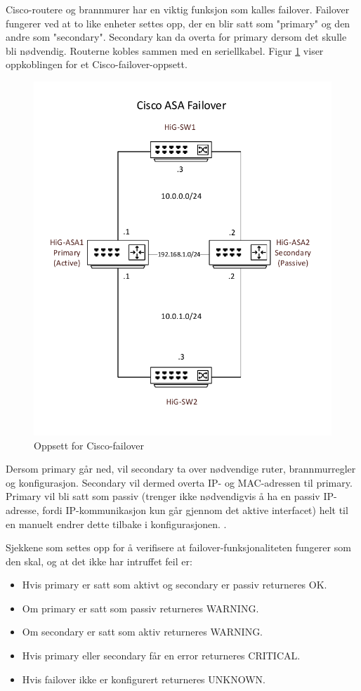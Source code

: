 Cisco-routere og brannmurer har en viktig funksjon som kalles failover. Failover fungerer ved at to like enheter settes opp, der en blir satt som "primary" og den andre som "secondary". Secondary kan da overta for primary dersom det skulle bli nødvendig. Routerne kobles sammen med en seriellkabel. Figur \ref{ciscoasafailover} viser oppkoblingen for et Cisco-failover-oppsett. 

\begin{figure}[H]
    \centering
    \includegraphics[scale=0.6]{img/asafailover}
    \caption{Oppsett for Cisco-failover}
    \label{ciscoasafailover}
\end{figure}

Dersom primary går ned, vil secondary ta over nødvendige ruter, brannmurregler og konfigurasjon. Secondary vil dermed overta IP- og MAC-adressen til primary. Primary vil bli satt som passiv (trenger ikke nødvendigvis å ha en passiv IP-adresse, fordi IP-kommunikasjon kun går gjennom det aktive interfacet) helt til en manuelt endrer dette tilbake i konfigurasjonen. \cite{ciscofailover}. 

Sjekkene som settes opp for å verifisere at failover-funksjonaliteten fungerer som den skal, og at det ikke har intruffet feil er:
\begin{itemize}
\item Hvis primary er satt som aktivt og secondary er passiv returneres OK.
\item Om primary er satt som passiv returneres WARNING. 
\item Om secondary er satt som aktiv returneres WARNING.
\item Hvis primary eller secondary får en error returneres CRITICAL.
\item Hvis failover ikke er konfigurert returneres UNKNOWN. 
\end{itemize}

